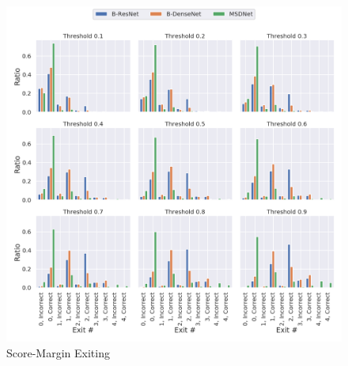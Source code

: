 \begin{figure}
	\centering
	\includegraphics[width=\linewidth]{figures/threshold_plots/inference_threshold_test}
	\caption{Score-Margin Exiting}
	\label{fig:inferencethresholdtest}
\end{figure}

